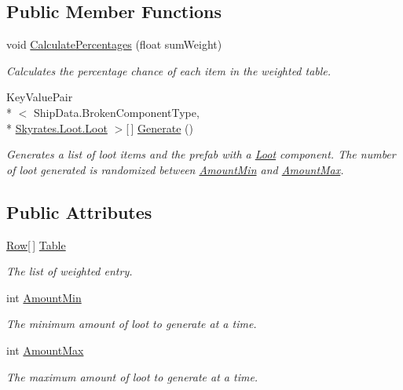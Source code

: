 \subsection*{Public Member Functions}
\begin{DoxyCompactItemize}
\item 
void \hyperlink{class_skyrates_1_1_loot_1_1_loot_table_a5a4e92ba67eedeb686f4e4b1bdcbf454}{Calculate\-Percentages} (float sum\-Weight)
\begin{DoxyCompactList}\small\item\em Calculates the percentage chance of each item in the weighted table. \end{DoxyCompactList}\item 
Key\-Value\-Pair\\*
$<$ Ship\-Data.\-Broken\-Component\-Type, \\*
\hyperlink{class_skyrates_1_1_loot_1_1_loot}{Skyrates.\-Loot.\-Loot} $>$\mbox{[}$\,$\mbox{]} \hyperlink{class_skyrates_1_1_loot_1_1_loot_table_aff3ad84db69c60336e14fb01fa4e4e58}{Generate} ()
\begin{DoxyCompactList}\small\item\em Generates a list of loot items and the prefab with a \hyperlink{class_skyrates_1_1_loot_1_1_loot}{Loot} component. The number of loot generated is randomized between \hyperlink{class_skyrates_1_1_loot_1_1_loot_table_a9ef0cb4eba51c0a7b2fb4a5fa507ee69}{Amount\-Min} and \hyperlink{class_skyrates_1_1_loot_1_1_loot_table_adb27de9ece245e9a29e96c68e267343b}{Amount\-Max}. \end{DoxyCompactList}\end{DoxyCompactItemize}
\subsection*{Public Attributes}
\begin{DoxyCompactItemize}
\item 
\hyperlink{class_skyrates_1_1_loot_1_1_loot_table_1_1_row}{Row}\mbox{[}$\,$\mbox{]} \hyperlink{class_skyrates_1_1_loot_1_1_loot_table_a02144c6a002bd609a0e53410466a1bc8}{Table}
\begin{DoxyCompactList}\small\item\em The list of weighted entry. \end{DoxyCompactList}\item 
int \hyperlink{class_skyrates_1_1_loot_1_1_loot_table_a9ef0cb4eba51c0a7b2fb4a5fa507ee69}{Amount\-Min}
\begin{DoxyCompactList}\small\item\em The minimum amount of loot to generate at a time. \end{DoxyCompactList}\item 
int \hyperlink{class_skyrates_1_1_loot_1_1_loot_table_adb27de9ece245e9a29e96c68e267343b}{Amount\-Max}
\begin{DoxyCompactList}\small\item\em The maximum amount of loot to generate at a time. \end{DoxyCompactList}\end{DoxyCompactItemize}


